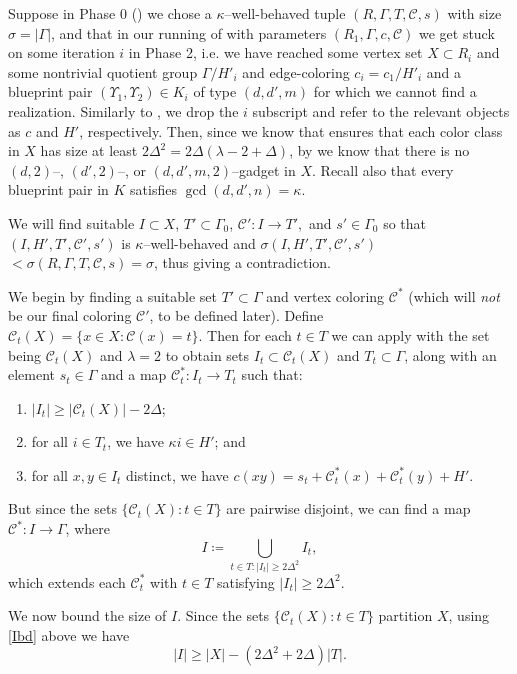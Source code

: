 \documentclass{article}
\newcommand{\beq}[1]{\begin{equation}\label{#1}}
\newcommand{\enq}[0]{\end{equation}}
\newcommand{\cC}{\mathcal{C} }
\theoremstyle{definition}
\begin{document}
Suppose in Phase 0 () we chose a $\kappa$--well-behaved tuple $(R,\Gamma,T,\cC,s)$ with size $\sigma=|\Gamma|$, and that in our running of  with parameters $(R_1,\Gamma,c,\cC)$ we get stuck on some iteration $i$ in Phase 2, i.e. we have reached some vertex set $X\subset R_i$ and some nontrivial quotient group $\Gamma/H'_i$ and edge-coloring $c_i=c_1/H'_i$ and a blueprint pair $(\Upsilon_1, \Upsilon_2)\in K_i$ of type $(d, d', m)$ for which we cannot find a realization. Similarly to , we drop the $i$ subscript and refer to the relevant objects as $c$ and $H'$, respectively. Then, since we know that  ensures that each color class in $X$ has size at least $2\Delta^2=2\Delta(\lambda-2+\Delta)$,  by  we know that there is no $(d,2)$--, $(d',2)$--, or $(d,d',m,2)$--gadget in $X$. Recall also that every blueprint pair in $K$ satisfies $\gcd(d,d',n)=\kappa$. 

We will find suitable $I\subset X$, $T'\subset \Gamma_0$, $\cC':I\to T',$ and $s'\in \Gamma_0$ so that $(I,H',T',\cC',s')$ is $\kappa$--well-behaved and $\sigma(I,H',T',\cC',s')$ $<\sigma(R,\Gamma,T,\cC,s)=\sigma$, thus giving a contradiction.

We begin by finding a suitable set $T'\subset \Gamma$ and vertex coloring $\cC^*$ (which will \emph{not} be our final coloring $\cC'$, to be defined later). Define $\cC_t(X) = \{x\in X: \cC(x)=t\}$. Then for each $t\in T$ we can apply  with the set being $\cC_t(X)$ and $\lambda=2$ to obtain sets $I_t \subset \cC_t(X)$ and $T_t\subset \Gamma$, along with an element $s_t\in \Gamma$ and a map $\cC^*_t:I_t\to T_t$ such that:

\begin{enumerate}
    \item\label{Ibd} $|I_t|\geq |\cC_t(X)|-2\Delta$;
    \item for all $i\in T_t$, we have $\kappa i \in H'$; and
    \item for all $x,y\in I_t$ distinct, we have $c(xy)=s_t+\cC^*_t(x)+\cC^*_t(y)+H'$.
\end{enumerate}

But since the sets $\{\cC_t(X): t\in T\}$ are pairwise disjoint, we can find a map $\cC^*:I\to \Gamma$, where 
\beq{Idef}I\coloneqq \bigcup_{t\in T:|I_t|\geq 2\Delta^2} I_t,\enq
which extends each $\cC^*_t$ with $t\in T$ satisfying $|I_t|\geq 2\Delta^2$.

We now bound the size of $I$. Since the sets $\{\cC_t(X): t\in T\}$ partition $X$, using \cref{Ibd} above we have \beq{sizeI}|I|\geq |X|-(2\Delta^2+2\Delta)|T|.\enq
\end{document}
